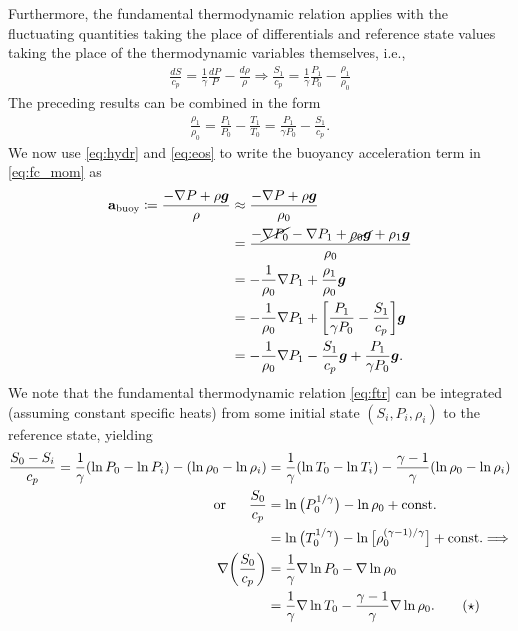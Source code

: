 \documentclass[12pt]{article} %
\begin{document}
	Furthermore, the fundamental thermodynamic relation applies with the fluctuating quantities taking the place of differentials and reference state values taking the place of the thermodynamic variables themselves, i.e., 
	\begin{align*}
	\frac{dS}{c_p}=\frac{1}{\gamma}\frac{dP}{P} - \frac{d\rho}{\rho}\Longrightarrow\frac{S_1}{c_p}=\frac{1}{\gamma}\frac{P_1}{P_0}-\frac{\rho_1}{\rho_0}
	\end{align*}
	The preceding results can be combined in the form
	\begin{align}
	\frac{\rho_1}{\rho_0} = \frac{P_1}{P_0} - \frac{T_1}{T_0} = \frac{P_1}{\gamma P_0} - \frac{S_1}{c_p}.
	\label{eq:eos}
	\end{align}
	We now use \eqref{eq:hydr} and \eqref{eq:eos} to write the buoyancy acceleration term in \eqref{eq:fc_mom} as 
	\begin{align*}
	\mathbf{a}_{\rm{buoy}} \coloneqq\frac{-\nabla P +\rho\bm{g}}{\rho} &\approx 
	\frac{-\nabla P +\rho\bm{g}}{\rho_0}\\
	&= \frac{-\cancel{\nabla P_0} - \nabla P_1 + \cancel{\rho_0\bm{g}} + \rho_1\bm{g}}{\rho_0}\\
	&= -\frac{1}{\rho_0}\nabla P_1 + \frac{\rho_1}{\rho_0}\bm{g}\\
	&=  -\frac{1}{\rho_0}\nabla P_1 + \bigg{[}\frac{P_1}{\gamma P_0} - \frac{S_1}{c_p}\bigg{]} \bm{g}\\
	&= -\frac{1}{\rho_0}\nabla P_1 - \frac{S_1}{c_p}\bm{g} + \frac{P_1}{\gamma P_0}\bm{g}.
	\end{align*}
	We note that the fundamental thermodynamic relation \eqref{eq:ftr} can be integrated (assuming constant specific heats) from some initial state $(S_i, P_i, \rho_i)$ to the reference state, yielding
	\begin{align*}
	\frac{S_0 - S_i}{c_p} = \frac{1}{\gamma}(\ln{P_0} - \ln{P_i}) - (\ln\rho_0 - \ln\rho_i)
	&= \frac{1}{\gamma}(\ln{T_0} - \ln{T_i}) - \frac{\gamma - 1}{\gamma}(\ln\rho_0 - \ln\rho_i)\\
	\text{or}\ \ \ \ \ \frac{S_0}{c_p} &= \ln\big{(}P_0^{1/\gamma}\big{)}- \ln\rho_0 + \text{const.}\\
	&= \ln\big{(}T_0^{1/\gamma}\big{)}- \ln\big{[}\rho_0^{(\gamma - 1)/\gamma}\big{]} + \text{const.}\Longrightarrow\\
	\nabla\bigg{(}\frac{S_0}{c_p}\bigg{)} &= \frac{1}{\gamma}\nabla\ln P_0 - \nabla\ln\rho_0\\
	&= \frac{1}{\gamma}\nabla\ln T_0  - \frac{\gamma-1}{\gamma}\nabla\ln\rho_0.
	\tag{$\star$}
	\label{eq:tdr_ref}
	\end{align*}
\end{document}
